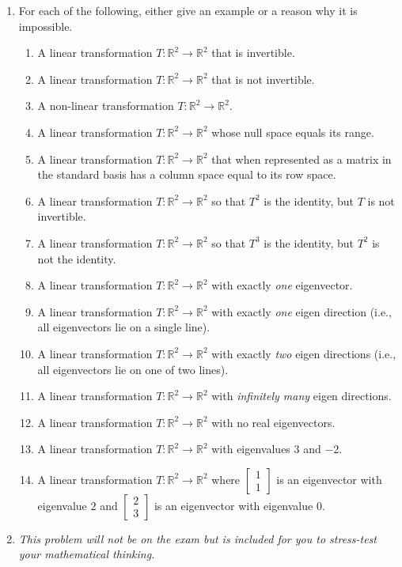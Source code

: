 \documentclass[letter]{article}
\newcommand{\R}{\mathbb{R}}
\newcommand{\mat}[1]{\begin{bmatrix}#1\end{bmatrix}}
\begin{document}
\begin{enumerate}
		\item For each of the following, either give an example or a reason why it is impossible.
		\begin{enumerate}
			\item A linear transformation $T:\R^2\to\R^2$ that is invertible.
			\item A linear transformation $T:\R^2\to\R^2$ that is not invertible.
			\item A non-linear transformation $T:\R^2\to\R^2$.
			\item A linear transformation $T:\R^2\to\R^2$ whose null space equals its range.
			\item A linear transformation $T:\R^2\to\R^2$ that when represented as a matrix in
			the standard basis has a column space equal to its row space.
			\item A linear transformation $T:\R^2\to\R^2$ so that $T^2$ is the identity, but $T$ is not invertible.
			\item A linear transformation $T:\R^2\to\R^2$ so that $T^3$ is the identity, but $T^2$ is not the identity.
			\item A linear transformation $T:\R^2\to\R^2$ with exactly \emph{one} eigenvector.
			\item A linear transformation $T:\R^2\to\R^2$ with exactly \emph{one} eigen direction (i.e., all eigenvectors lie on a single line).
			\item A linear transformation $T:\R^2\to\R^2$ with exactly \emph{two} eigen directions (i.e., all eigenvectors lie on one of two lines).
			\item A linear transformation $T:\R^2\to\R^2$ with \emph{infinitely many} eigen directions.
			\item A linear transformation $T:\R^2\to\R^2$ with no real eigenvectors.
			\item A linear transformation $T:\R^2\to\R^2$ with eigenvalues $3$ and $-2$.
			\item A linear transformation $T:\R^2\to\R^2$ where $\mat{1\\1}$ is an eigenvector with eigenvalue $2$ and $\mat{2\\3}$
				is an eigenvector with eigenvalue $0$.
		\end{enumerate}

	\item {\it This problem will not be on the exam but is included for you to stress-test your
		mathematical thinking.}
		

\end{enumerate}
\end{document}
